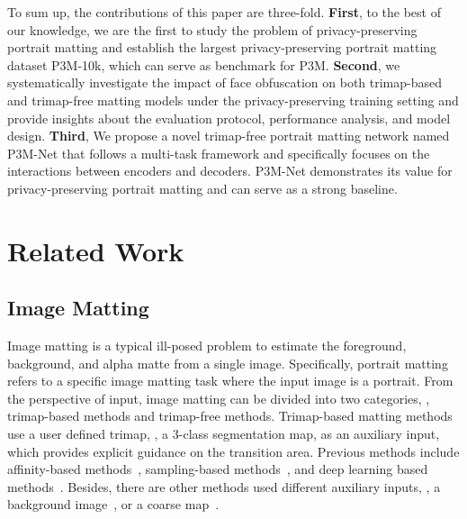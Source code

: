 \documentclass[sigconf]{acmart}
\begin{document}
To sum up, the contributions of this paper are three-fold. \textbf{First}, to the best of our knowledge, we are the first to study the problem of privacy-preserving portrait matting and establish the largest privacy-preserving portrait matting dataset P3M-10k, which can serve as benchmark for P3M. \textbf{Second}, we systematically investigate the impact of face obfuscation on both trimap-based and trimap-free matting models under the privacy-preserving training setting and provide insights about the evaluation protocol, performance analysis, and model design. \textbf{Third}, We propose a novel trimap-free portrait matting network named P3M-Net that follows a multi-task framework and specifically focuses on the interactions between encoders and decoders. P3M-Net demonstrates its value for privacy-preserving portrait matting and can serve as a strong baseline.



\section{Related Work}
\subsection{Image Matting}
Image matting is a typical ill-posed problem to estimate the foreground, background, and alpha matte from a single image. Specifically, portrait matting refers to a specific image matting task where the input image is a portrait. From the perspective of input, image matting can be divided into two categories, , trimap-based methods and trimap-free methods. Trimap-based matting methods use a user defined trimap, , a 3-class segmentation map, as an auxiliary input, which provides explicit guidance on the transition area. Previous methods include affinity-based methods~\cite{levin2007closed,aksoy2018semantic}, sampling-based methods~\cite{he2011global,shahrian2013improving}, and deep learning based methods~\cite{lu2019indices,hou2019context}. Besides, 
there are other methods used different auxiliary inputs, , a background image~\cite{backgroundmatting,backgroundmattingv2}, or a coarse map~\cite{yu2021mask}.
\end{document}

